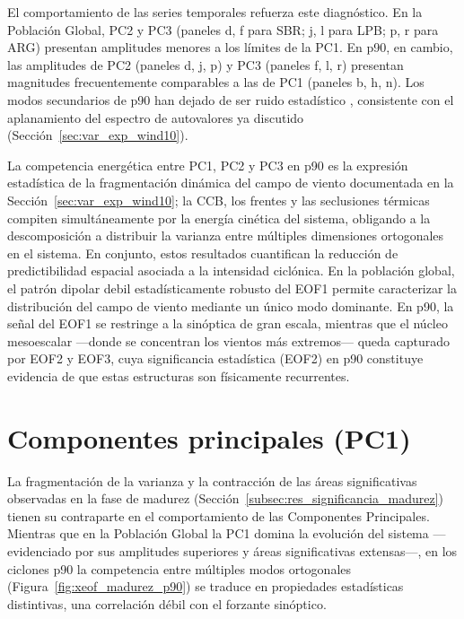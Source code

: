 El comportamiento de las series temporales refuerza este diagnóstico. 
En la Población Global, PC2 y PC3 (paneles d, f para SBR; j, l para LPB; p, r para ARG) presentan amplitudes menores a los límites de la PC1.
En p90, en cambio, las amplitudes de PC2 (paneles d, j, p) y PC3 (paneles f, l, r) presentan magnitudes frecuentemente comparables a las de PC1 (paneles b, h, n). 
Los modos secundarios de p90 han dejado de ser ruido estadístico \citep{hannachi2023eof}, consistente con el aplanamiento del espectro de autovalores ya discutido (Sección~\ref{sec:var_exp_wind10}).

La competencia energética entre PC1, PC2 y PC3 en p90 es la expresión estadística de la fragmentación dinámica del campo de viento documentada en la Sección~\ref{sec:var_exp_wind10}; la CCB, los frentes y las seclusiones térmicas compiten simultáneamente por la energía cinética del sistema, obligando a la descomposición a distribuir la varianza entre múltiples dimensiones ortogonales en el sistema.
En conjunto, estos resultados cuantifican la reducción de predictibilidad espacial asociada a la intensidad ciclónica. 
En la población global, el patrón dipolar debil estadísticamente robusto del EOF1 permite caracterizar la distribución del campo de viento mediante un único modo dominante.
En p90, la señal del EOF1 se restringe a la sinóptica de gran escala, mientras que el núcleo mesoescalar ---donde se concentran los vientos más extremos--- queda capturado por EOF2 y EOF3, cuya significancia estadística (EOF2) en p90 constituye evidencia de que estas estructuras son físicamente recurrentes. 

\section{Componentes principales (PC1)}\label{subsec:res_dinamica_pc1}

La fragmentación de la varianza y la contracción de las áreas significativas observadas en la fase de madurez (Sección~\ref{subsec:res_significancia_madurez}) tienen su contraparte en el comportamiento de las Componentes Principales. 
Mientras que en la Población Global la PC1 domina la evolución del sistema ---evidenciado por sus amplitudes superiores y áreas significativas extensas---, en los ciclones p90 la competencia entre múltiples modos ortogonales (Figura~\ref{fig:xeof_madurez_p90}) se traduce en propiedades estadísticas distintivas, una correlación débil con el forzante sinóptico.



